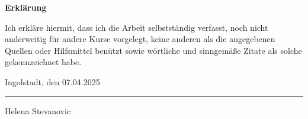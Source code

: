 \noindent
\textbf{Erklärung} 

\vspace{1.5cm}

\noindent
Ich erkläre hiermit, dass ich die Arbeit selbstständig verfasst, noch nicht anderweitig für 
andere Kurse vorgelegt, keine anderen als die angegebenen Quellen oder Hilfsmittel benützt 
sowie wörtliche und sinngemäße Zitate als solche gekennzeichnet habe.

\vspace{1.5cm}

\noindent
Ingolstadt, den 07.04.2025


\vspace{2.5cm}


\noindent
\rule{6cm}{0.1mm}

\noindent
Helena Stevanovic
